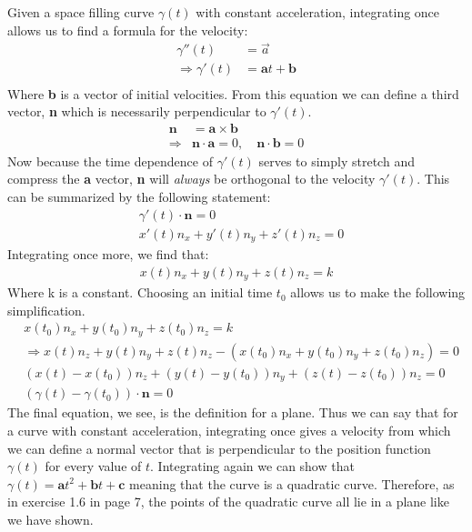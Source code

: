 \documentclass[a4paper, 11pt]{article}
\begin{document}
\noindent Given a space filling curve $\gamma(t)$ with constant acceleration, integrating once allows us to find a formula for the velocity: 
	\begin{align*}
		\gamma''(t) &= \vec{a} \\ 
		\Rightarrow \gamma'(t) &= \mathbf{a}t + \mathbf{b} \\ 
	\end{align*}
Where \textbf{b} is a vector of initial velocities. From this equation we can define a third vector, \textbf{n} which is necessarily perpendicular to $\gamma'(t)$. 
	\begin{align*}
		\mathbf{n} &= \mathbf{a} \times \mathbf{b} \\ 
		\Rightarrow &\mathbf{n}\cdot\mathbf{a} = 0, \quad \mathbf{n}\cdot\mathbf{b} = 0
	\end{align*}
Now because the time dependence of $\gamma'(t)$ serves to simply stretch and compress the \textbf{a} vector, \textbf{n} will \textit{always} be orthogonal to the velocity $\gamma'(t)$. This can be summarized by the following statement: 
	\begin{align*}
		&\gamma'(t)\cdot\mathbf{n} = 0 \\ 
		&x'(t)n_x + y'(t)n_y + z'(t)n_z = 0 
	\end{align*}
Integrating once more, we find that: 
	\begin{align*}
		x(t)n_x + y(t)n_y + z(t)n_z = k
	\end{align*}
Where k is a constant. Choosing an initial time $t_0$ allows us to make the following simplification. 
	\begin{align*}
		&x(t_0)n_x + y(t_0)n_y + z(t_0)n_z = k \\ 
		&\Rightarrow x(t)n_z + y(t)n_y + z(t)n_z - (x(t_0)n_x + y(t_0)n_y + z(t_0)n_z) = 0 \\
		&(x(t)-x(t_0))n_z + (y(t)-y(t_0))n_y + (z(t)-z(t_0))n_z = 0 \\ 
		&(\gamma(t)-\gamma(t_0))\cdot\mathbf{n} = 0
	\end{align*}
The final equation, we see, is the definition for a plane. Thus we can say that for a curve with constant acceleration, integrating once gives a velocity from which we can define a normal vector that is perpendicular to the position function $\gamma(t)$ for every value of $t$. Integrating again we can show that $\gamma(t) = \mathbf{a}t^2 + \mathbf{b} t + \mathbf{c}$ meaning that the curve is a quadratic curve. Therefore, as in exercise 1.6 in page 7, the points of the quadratic curve all lie in a plane like we have shown. \\
\end{document}
